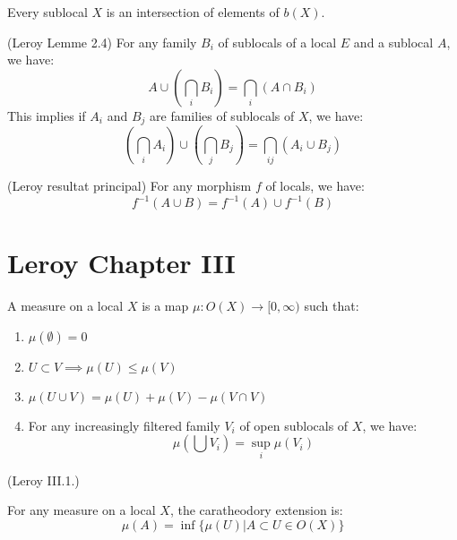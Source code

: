 \begin{lemma}
    Every sublocal $X$ is an intersection of elements of $b(X)$.
    \label{lem:b_X_generates_sublocals}
\end{lemma}


\begin{lemma}
(Leroy Lemme 2.4)
    \label{lem:union_of_intersections}
    For any family $B_i$ of sublocals of a local $E$ and a sublocal $A$, we have:
    \[A \cup (\bigcap_i B_i) = \bigcap_i (A \cap B_i)\]
    This implies if $A_i$ and $B_j$ are families of sublocals of $X$, we have:
    \[(\bigcap_i A_i)\cup(\bigcap_j B_j) =  \bigcap_{ij}(A_i \cup B_j)\]
\end{lemma}


\begin{theorem}
(Leroy resultat principal)
    \label{thm:preimage_commutes_with_unions}
    For any morphism $f$ of locals, we have:
    \[f^{-1}(A \cup B) = f^{-1}(A) \cup f^{-1}(B)\]
\end{theorem}


\chapter{Leroy Chapter III}\label{sec:leroy-chapter-iii}
\begin{definition}
    \label{def:measure_on_locals}
    A measure on a local $X$ is a map $\mu : O(X) \to [0,\infty)$ such that:
    \begin{enumerate}
        \item $\mu(\emptyset) = 0$
        \item $U \subset V \implies \mu(U) \le \mu(V)$
        \item $\mu(U \cup V) = \mu(U) + \mu(V) - \mu(V \cap V)$
        \item For any increasingly filtered family $V_i$ of open sublocals of $X$, we have:
        \[\mu(\bigcup V_i) = \sup_i \mu(V_i)\]
    \end{enumerate}
    (Leroy III.1.)
\end{definition}

\begin{definition}[Caratheodory]
    \label{def:caratheodory}
    For any measure on a local $X$, the caratheodory extension is:
    \[\mu(A) = \inf \{\mu(U) | A \subset U \in O(X)\}\]
\end{definition}

